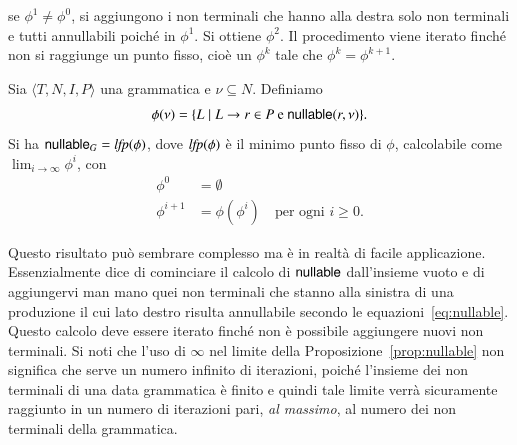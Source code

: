 se $\phi^1\not=\phi^0$, si aggiungono i non terminali che hanno alla
destra solo non terminali e tutti annullabili poich\'e in $\phi^1$.
Si ottiene \cosi $\phi^2$. Il procedimento viene iterato finch\'e
non si raggiunge un punto fisso, cio\`e un $\phi^k$ tale che
$\phi^k=\phi^{k+1}$.
%
\begin{proposition}\label{prop:nullable}
Sia $\langle T,N,I,P\rangle$ una grammatica e $\nu\subseteq N$.
Definiamo
\[
  \phi(\nu)=\{L\mid L\to r\in P\text{ e }\mathsf{nullable}(r,\nu)\}.
\]
Si ha $\mathsf{nullable}_G=\mathit{lfp}(\phi)$, dove $\mathit{lfp}(\phi)$ \`e il minimo punto
fisso di $\phi$, calcolabile come $\lim_{i\to\infty}\phi^i$, con
\begin{align*}
  \phi^0&=\emptyset\\
  \phi^{i+1}&=\phi(\phi^i)\quad\text{per ogni $i\ge 0$.}
\end{align*}
\end{proposition}
%
Questo risultato pu\`o sembrare complesso ma \`e in realt\`a di facile
applicazione. Essenzialmente dice di cominciare il calcolo
di $\mathsf{nullable}$ dall'insieme vuoto e di aggiungervi man mano quei non terminali
che stanno alla sinistra di una produzione il cui lato destro risulta
annullabile secondo le equazioni~\eqref{eq:nullable}. Questo calcolo deve
essere iterato finch\'e non \`e \piu possibile aggiungere nuovi non terminali.
Si noti che l'uso di $\infty$ nel limite della Proposizione~\ref{prop:nullable}
non significa che serve un numero infinito di iterazioni, poich\'e l'insieme
dei non terminali di una data grammatica
\`e finito e quindi tale limite verr\`a sicuramente raggiunto
in un numero di iterazioni pari, \emph{al massimo}, al numero dei non terminali
della grammatica.

